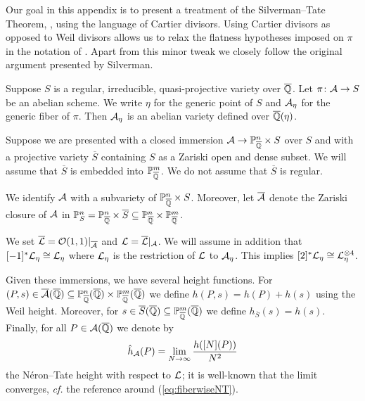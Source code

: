 
Our goal in this appendix is to present a treatment of the
Silverman--Tate Theorem, \cite[Theorem~A]{Silverman}, using the language
of Cartier divisors. Using Cartier divisors as opposed to Weil
divisors  allows us to relax the flatness 
hypotheses imposed on $\pi$ in the notation of \cite[$\mathsection$3]{Silverman}. Apart from this minor tweak
we closely follow the original argument presented by Silverman. 

Suppose $S$ is a {regular},
{irreducible}, {quasi-projective} variety over ${\overline{\mathbb{Q}}}$.
Let $\pi \colon \mathcal{A}\rightarrow S$ be an abelian scheme.
We write $\eta$ for the generic point of $S$ and $\mathcal{A}_\eta$ for the
generic fiber of $\pi$. Then $\mathcal{A}_\eta$ is an abelian variety defined
over ${\overline{\mathbb{Q}}}(\eta)$. 

Suppose we are presented with a closed immersion
$\mathcal{A}\rightarrow {\mathbb{P}}_{{\overline{\mathbb{Q}}}}^n\times S$ over $S$ and
 with a projective variety $\overline S$
containing $S$ as a Zariski open and dense subset.
We will assume that $\overline S$ is embedded into ${\mathbb{P}}_{\overline{\mathbb{Q}}}^m$.
We do not assume that $\overline S$ is regular. %

We identify $\mathcal{A}$ with a subvariety of ${\mathbb{P}}_{\overline{\mathbb{Q}}}^n\times S$.
Moreover, let $\overline{\mathcal{A}}$ denote the Zariski closure of 
$\mathcal{A}$ in ${\mathbb{P}}_S^n={\mathbb{P}}_{{\overline{\mathbb{Q}}}}^n\times\overline S \subseteq
{\mathbb{P}}_{{\overline{\mathbb{Q}}}}^n\times{\mathbb{P}}_{\overline{\mathbb{Q}}}^m$. %

We set $\overline{{\mathcal L}} = {\mathcal O}(1,1)|_{\overline{\mathcal{A}}}$ and  ${\mathcal L}
= \overline{{\mathcal L}}|_{\mathcal{A}}$. We  will  assume in addition that 
$[-1]^*{\mathcal L}_\eta \cong {\mathcal L}_\eta$ 
where  ${\mathcal L}_\eta$ is the restriction of ${\mathcal L}$ to $\mathcal{A}_\eta$. 
This implies
$[2]^*{\mathcal L}_\eta \cong {\mathcal L}_\eta^{\otimes 4}$.

\newcommand{\hcA}{h}

Given these immersions, we have several height functions.
For
$(P,s)\in \overline{\mathcal{A}}({\overline{\mathbb{Q}}})\subseteq {\mathbb{P}}^n_{\overline{\mathbb{Q}}}({\overline{\mathbb{Q}}})\times {\mathbb{P}}^m_{\overline{\mathbb{Q}}}({\overline{\mathbb{Q}}})$ we define
$\hcA(P,s) = h(P)+h(s)$ using the Weil height.
Moreover, for $s\in \overline S({\overline{\mathbb{Q}}})\subseteq {\mathbb{P}}^m_{\overline{\mathbb{Q}}}({\overline{\mathbb{Q}}})$
we define $h_{\overline S}(s) = h(s)$. 
Finally, 
for all  $P\in \mathcal{A}({\overline{\mathbb{Q}}})$ we denote by
  \begin{equation*}
    \hat h_{\cA}(P) = \lim_{N\rightarrow \infty}
    \frac{\hcA([N](P))}{N^2}
  \end{equation*}
the N\'eron--Tate height with respect to ${\mathcal L}$;  it is
well-known that the limit converges, \textit{cf.} the reference around
(\ref{eq:fiberwiseNT}). 
  
